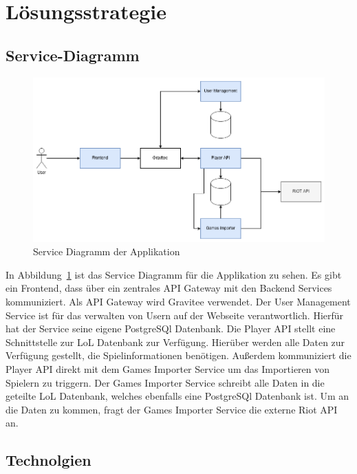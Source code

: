 \section{Lösungsstrategie}

\subsection{Service-Diagramm}

\begin{figure}
    \centering
    \includegraphics[width=\textwidth]{images/cdc-05-service-diagram.drawio}
    \caption{Service Diagramm der Applikation}
    \label{fig:service-diagram}
\end{figure}

In Abbildung~\ref{fig:service-diagram} ist das Service Diagramm für die Applikation zu sehen.
Es gibt ein Frontend, dass über ein zentrales API Gateway mit den Backend Services kommuniziert.
Als API Gateway wird Gravitee verwendet.
Der User Management Service ist für das verwalten von Usern auf der Webseite verantwortlich.
Hierfür hat der Service seine eigene PostgreSQl Datenbank.
Die Player API stellt eine Schnittstelle zur LoL Datenbank zur Verfügung.
Hierüber werden alle Daten zur Verfügung gestellt, die Spielinformationen benötigen.
Außerdem kommuniziert die Player API direkt mit dem Games Importer Service um das Importieren von Spielern zu triggern.
Der Games Importer Service schreibt alle Daten in die geteilte LoL Datenbank, welches ebenfalls eine PostgreSQl Datenbank ist.
Um an die Daten zu kommen, fragt der Games Importer Service die externe Riot API an.

\subsection{Technolgien}

